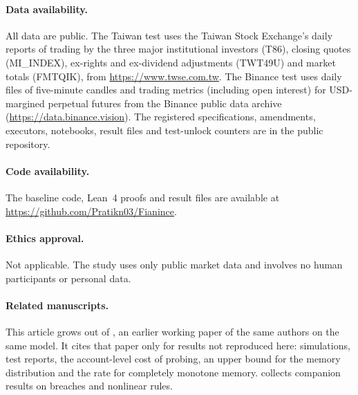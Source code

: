 \documentclass[12pt]{article}
\theoremstyle{definition}
\theoremstyle{remark}
\begin{document}
\paragraph{Data availability.} All data are public. The Taiwan test uses the Taiwan Stock Exchange's daily reports of trading by the three major institutional investors (T86), closing quotes (MI\_INDEX), ex-rights and ex-dividend adjustments (TWT49U) and market totals (FMTQIK), from \url{https://www.twse.com.tw}. The Binance test uses daily files of five-minute candles and trading metrics (including open interest) for USD-margined perpetual futures from the Binance public data archive (\url{https://data.binance.vision}). The registered specifications, amendments, executors, notebooks, result files and test-unlock counters are in the public repository.

\paragraph{Code availability.} The baseline code, Lean~4 proofs and result files are available at \url{https://github.com/Pratikn03/Fianince}.

\paragraph{Ethics approval.} Not applicable. The study uses only public market data and involves no human participants or personal data.

\paragraph{Related manuscripts.} This article grows out of \citet{niroula2026a}, an earlier working paper of the same authors on the same model. It cites that paper only for results not reproduced here: simulations, test reports, the account-level cost of probing, an upper bound for the memory distribution and the rate for completely monotone memory. \citet{niroula2026c} collects companion results on breaches and nonlinear rules.
\end{document}
